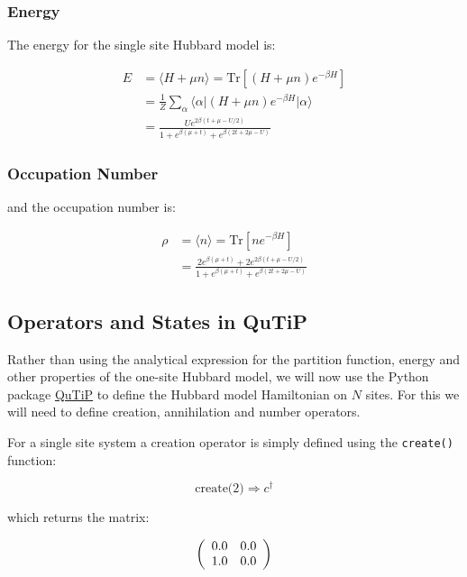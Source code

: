 \documentclass{article}
\begin{document}
    \subsubsection{Energy}\label{energy}

The energy for the single site Hubbard model is:

\begin{align}
    E & = \langle H + \mu n \rangle = \text{Tr} \left[ (H + \mu n) e^{-\beta H} \right] \\
      & = \frac{1}{Z} \sum_\alpha \langle \alpha \vert (H + \mu n) e^{-\beta H} \vert \alpha \rangle \\ 
      & = \frac{U e^{2\beta(t+\mu - U/2)}}{1 + e^{\beta(\mu + t)} + e^{\beta(2t + 2\mu - U)}}
\end{align}

\subsubsection{Occupation Number}\label{occupation-number}

and the occupation number is:

\begin{align}
    \rho & = \langle n \rangle = \text{Tr} \left[ n e^{-\beta H} \right] \\
         & = \frac{2 e^{\beta(\mu + t)} + 2 e^{2\beta(t+\mu-U/2)}}{1 + e^{\beta(\mu + t)} + e^{\beta(2t + 2\mu - U)}}
\end{align}

    \subsection{Operators and States in
QuTiP}\label{operators-and-states-in-qutip}

    Rather than using the analytical expression for the partition function,
energy and other properties of the one-site Hubbard model, we will now
use the Python package \href{http://qutip.org/}{QuTiP} to define the
Hubbard model Hamiltonian on \(N\) sites. For this we will need to
define creation, annihilation and number operators.

For a single site system a creation operator is simply defined using the
\texttt{create()} function:

\[\text{create(2)} \Rightarrow c^\dagger\]

which returns the matrix:

\begin{equation*}\left(\begin{array}{*{11}c}0.0 & 0.0\\1.0 & 0.0\\\end{array}\right)\end{equation*}
\end{document}
